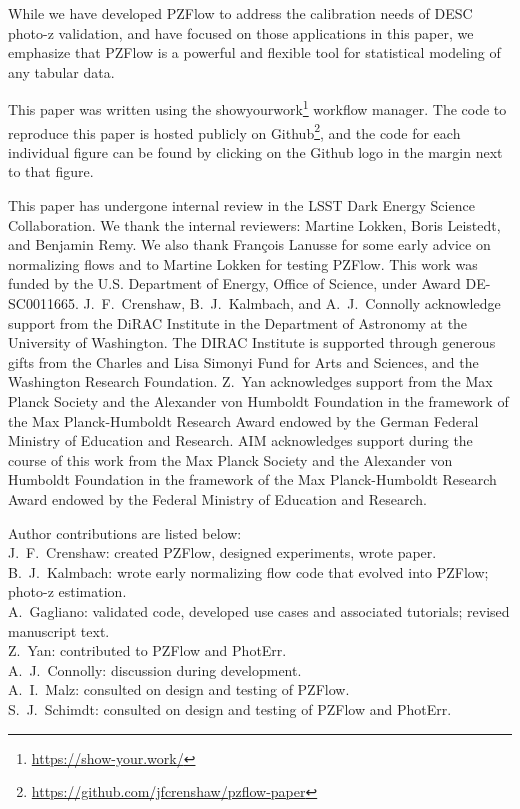 \documentclass[twocolumn,twocolappendix]{aastex631}
\begin{document}
While we have developed PZFlow to address the calibration needs of DESC photo-z validation, and have focused on those applications in this paper, we emphasize that PZFlow is a powerful and flexible tool for statistical modeling of any tabular data.

This paper was written using the showyourwork\footnote{\url{https://show-your.work/}} workflow manager.
The code to reproduce this paper is hosted publicly on Github\footnote{\url{https://github.com/jfcrenshaw/pzflow-paper}}, and the code for each individual figure can be found by clicking on the Github logo in the margin next to that figure.

\begin{acknowledgements}
    This paper has undergone internal review in the LSST Dark Energy Science Collaboration.
    We thank the internal reviewers: Martine Lokken, Boris Leistedt, and Benjamin Remy.
    We also thank François Lanusse for some early advice on normalizing flows and to Martine Lokken for testing PZFlow.
    This work was funded by the U.S. Department of Energy, Office of Science, under Award DE-SC0011665.
    J.~F.~Crenshaw, B.~J.~Kalmbach, and A.~J.~Connolly acknowledge support from the DiRAC Institute in the Department of Astronomy at the University of Washington.
    The DIRAC Institute is supported through generous gifts from the Charles and Lisa Simonyi Fund for Arts and Sciences, and the Washington Research Foundation.
    Z.~Yan acknowledges support from the Max Planck Society and the Alexander von Humboldt Foundation in the framework of the Max Planck-Humboldt Research Award endowed by the German Federal Ministry of Education and Research.
    AIM acknowledges support during the course of this work from the Max Planck Society and the Alexander von Humboldt Foundation in the framework of the Max Planck-Humboldt Research Award endowed by the Federal Ministry of Education and Research.

    Author contributions are listed below: \\
    J.~F.~Crenshaw: created PZFlow, designed experiments, wrote paper. \\
    B.~J.~Kalmbach: wrote early normalizing flow code that evolved into PZFlow; photo-z estimation. \\
    A.~Gagliano: validated code, developed use cases and associated tutorials; revised manuscript text. \\
    Z.~Yan: contributed to PZFlow and PhotErr. \\
    A.~J.~Connolly: discussion during development. \\
    A.~I.~Malz: consulted on design and testing of PZFlow. \\
    S.~J.~Schimdt: consulted on design and testing of PZFlow and PhotErr. \\
\end{acknowledgements}
\end{document}
